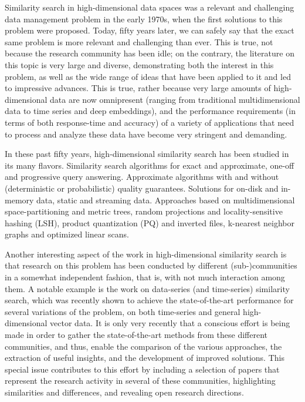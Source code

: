 \documentclass[11pt]{article}
\begin{document}
Similarity search in high-dimensional data spaces was a relevant and challenging data management problem in the early 1970s, when the first solutions to this problem were proposed. 
Today, fifty years later, we can safely say that the exact same problem is more relevant and challenging than ever. 
This is true, not because the research community has been idle; on the contrary, the literature on this topic is very large and diverse, demonstrating both the interest in this problem, as well as the wide range of ideas that have been applied to it and led to impressive advances. 
This is true, rather because very large amounts of high-dimensional data are now omnipresent (ranging from traditional multidimensional data to time series and deep embeddings), and the performance requirements (in terms of both response-time and accuracy) of a variety of applications that need to process and analyze these data have become very stringent and demanding.

In these past fifty years, high-dimensional similarity search has been studied in its many flavors. Similarity search algorithms for exact and approximate, one-off and progressive query answering. 
Approximate algorithms with and without (deterministic or probabilistic) quality guarantees.
Solutions for on-disk and in-memory data, static and streaming data.
Approaches based on multidimensional space-partitioning and metric trees, random projections and locality-sensitive hashing (LSH), product quantization (PQ) and inverted files, k-nearest neighbor graphs and optimized linear scans.

Another interesting aspect of the work in high-dimensional similarity search is that research on this problem has been conducted by different (sub-)communities in a somewhat independent fashion, that is, with not much interaction among them.
A notable example is the work on data-series (and time-series) similarity search, which was recently shown to achieve the state-of-the-art performance for several variations of the problem, on both time-series and general high-dimensional vector data.
It is only very recently that a conscious effort is being made in order to gather the state-of-the-art methods from these different communities, and thus, enable the comparison of the various approaches, the extraction of useful insights, and the development of improved solutions.
This special issue contributes to this effort by including a selection of papers that represent the research activity in several of these communities, highlighting similarities and differences, and revealing open research directions.
\end{document}
